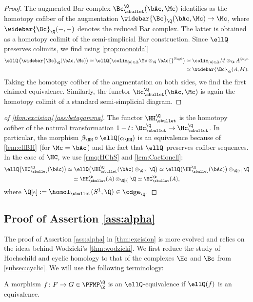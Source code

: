 \begin{proof}
The augmented Bar complex $\Bc_\sbullet^\Q(\bAc,\Mc)$ identifies as the homotopy cofiber of the augmentation $\widebar{\Bc}_\Q(\bAc,\Mc) \to \Mc$, where $\widebar{\Bc}_\Q(-,-)$ denotes the reduced Bar complex. The latter is obtained as a homotopy colimit of the semi-simplicial Bar construction.
Since $\ellQ$ preserves colimits, we find using \autoref{prop:monoidal}
\begin{align*}
\ellQ\left(\widebar{\Bc}_\Q(\bAc,\Mc)\right) \simeq \ellQ\bigl(\colim_{[n] \in \Delta} \Mc \otimes_\Q \bAc{}^{\otimes_\Q n}\bigr) &\simeq \colim_{[n] \in \Delta} M \otimes_\k A^{\otimes_\k n}\\
&\simeq \widebar{\Bc}_\k(A,M).
\end{align*}
Taking the homotopy cofiber of the augmentation on both sides, we find the first claimed equivalence.
Similarly, the functor $\Hc_\sbullet^\Q(\bAc, \Mc)$ is again the homotopy colimit of a standard semi-simplicial diagram.
\end{proof}

\begin{proof}[of \autoref{thm:excision}\,\eqref{ass:betagamma}]
The functor $\HH_\sbullet^\Q$ is the homotopy cofiber of the natural transformation $1-t \colon \Bc_\sbullet^\Q \to \Hc_\sbullet^\Q$. In particular, the morphism $\beta_{\HH} \circ\ellQ(\alpha_{\HH})$ is an equivalence because of \autoref{lem:ellBH} (for $\Mc = \bAc$) and the fact that $\ellQ$ preserves cofiber sequences.
In the case of $\HC$, we use \autoref{rmq:HChS} and \autoref{lem:Cactionell}:
\begin{multline*}
\ellQ\bigl(\HC_\sbullet^\Q(\bAc)\bigr) \simeq \ellQ\bigl(\HH_\sbullet^\Q(\bAc) \otimes_{\Q[\epsilon]} \Q \bigr) \simeq \ellQ\bigl(\HH_\sbullet^\Q(\bAc)\bigr) \otimes_{\Q[\epsilon]} \Q
\\\simeq \HH_\sbullet^\k(A) \otimes_{\Q[\epsilon]} \Q
\simeq \HC_\sbullet^\k(A),
\end{multline*}
where $\Q[\epsilon] := \homol_\sbullet(S^1, \Q) \in \cdga_\Q$.
\end{proof}

\subsection{Proof of Assertion \eqref{ass:alpha}}
The proof of Assertion \eqref{ass:alpha} in \autoref{thm:excision} is more evolved and relies on the ideas behind Wodzicki's \autoref{thm:wodzicki}. We first reduce the study of Hochschild and cyclic homology to that of the complexes $\Hc$ and $\Bc$ from \autoref{subsec:cyclic}.
We will use the following terminology:
\begin{df}
A morphism $f \colon F \to G \in \PFMP_\k^\Q$ is an $\ellQ$-equivalence if $\ellQ(f)$ is an equivalence.
\end{df}

